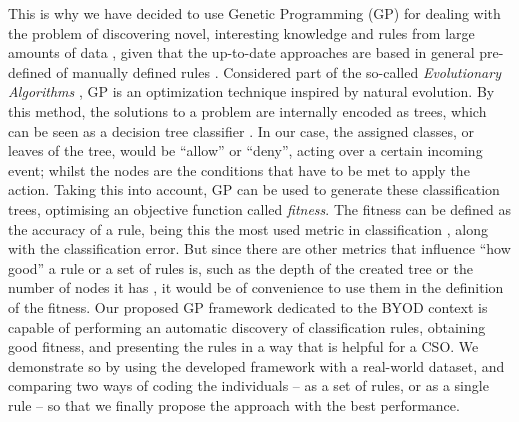 \documentclass[a4paper,10pt,twocolumn,preprint,3p]{elsarticle}
\begin{document}
This is why we have decided to use Genetic Programming (GP) for dealing with the problem of
discovering novel, interesting knowledge and rules from large
amounts of data \cite{freitas2002data}, given that the up-to-date approaches are based in general pre-defined of manually defined rules \cite{ali2015analysis}. Considered part of the so-called \emph{Evolutionary
  Algorithms} \cite{back1996evolutionary}, GP is an optimization
technique inspired by natural evolution. By this method, the
solutions to a problem are internally encoded as trees, which can be
seen as a decision tree classifier \cite{safavian1990survey}. In our
case, the assigned classes, or leaves of the tree, would be ``allow''
or ``deny'', acting over a certain incoming event; whilst the nodes
are the conditions that have to be met to apply the action. Taking
this into account, GP can be used to generate these classification
trees, optimising an objective function called {\em fitness}. The
fitness can be defined as the accuracy of a rule, being this the most
used metric in classification \cite{witten2005data}, along with the
classification error. But since there are other metrics that influence
``how good'' a rule or a set of rules is, such as the depth of the
created tree or the number of nodes it has
\cite{back1996evolutionary}, it would be of convenience to use them in
the definition of the fitness. 
Our proposed GP framework dedicated %
to the BYOD context is capable of performing an automatic discovery
of classification rules, obtaining good fitness, and presenting the
rules in a way that is helpful for a CSO. We demonstrate so by using
the developed framework with a real-world dataset, and comparing two
ways of coding the individuals -- as a set of rules, or as a single
rule -- so that we finally propose the approach with the best
performance. %
\end{document}
